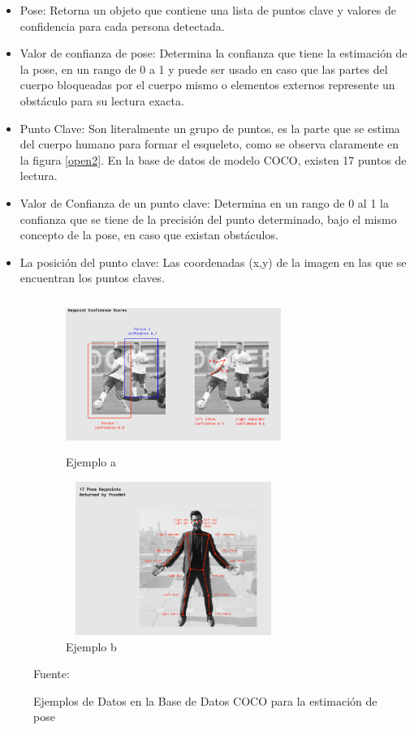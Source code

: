 \begin{itemize}
	\item Pose: Retorna un objeto que contiene una lista de puntos clave y valores de confidencia para cada persona detectada.
	\item Valor de confianza de pose: Determina la confianza que tiene la estimación de la pose, en un rango de 0 a 1 y puede ser usado en caso que las partes del cuerpo bloqueadas por el cuerpo mismo o elementos externos represente un obstáculo para su lectura exacta.
	\item Punto Clave: Son literalmente un grupo de puntos, es la parte que se estima del cuerpo humano para formar el esqueleto, como se observa claramente en la figura \ref{open2}. En la base de datos de modelo COCO, existen 17 puntos de lectura.
	\item Valor de Confianza de un punto clave: Determina en un rango de 0 al 1 la confianza que se tiene de la precisión del punto determinado, bajo el mismo concepto de la pose, en caso que existan obstáculos.
	\item La posición del punto clave: Las coordenadas (x,y) de la imagen en las que se encuentran los puntos claves.
\end{itemize}

\begin{figure}[ht]
	\centering
	\begin{subfigure}{.5\textwidth}
		\centering
		\includegraphics[width=7cm,height=5cm,]{./Images/posenetcocoexample.png}
		\caption{Ejemplo a}
		\label{posenet1}
	\end{subfigure}%
	\begin{subfigure}{.5\textwidth}
		\centering
		\includegraphics[width=7cm,height=5cm]{./Images/posenetexample2.png}
		\caption{Ejemplo b}
		\label{posenet2}
	\end{subfigure}
	\caption{Ejemplos de Datos en la Base de Datos COCO para la estimación de pose}
	\footnotesize Fuente: \cite{kendall2015posenet} \cite{oved2018real}
	\label{exampleposenet}
\end{figure}

